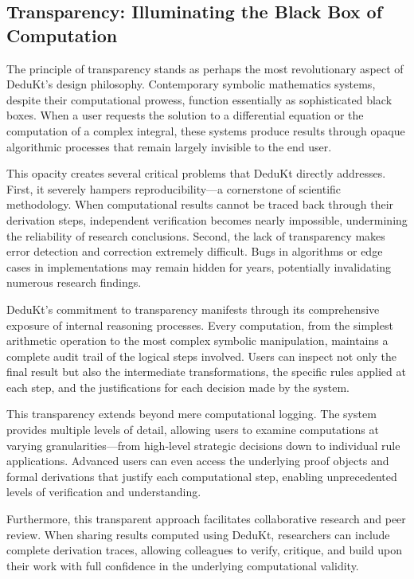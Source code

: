 \subsection{Transparency: Illuminating the Black Box of Computation}\label{subsec:transparency:-illuminating-the-black-box-of-computation}

The principle of transparency stands as perhaps the most revolutionary aspect of DeduKt's design philosophy.
Contemporary symbolic mathematics systems, despite their computational prowess, function essentially as sophisticated black boxes.
When a user requests the solution to a differential equation or the computation of a complex integral, these systems produce results through opaque algorithmic processes that remain largely invisible to the end user.

This opacity creates several critical problems that DeduKt directly addresses.
First, it severely hampers reproducibility—a cornerstone of scientific methodology.
When computational results cannot be traced back through their derivation steps, independent verification becomes nearly impossible, undermining the reliability of research conclusions.
Second, the lack of transparency makes error detection and correction extremely difficult.
Bugs in algorithms or edge cases in implementations may remain hidden for years, potentially invalidating numerous research findings.

DeduKt's commitment to transparency manifests through its comprehensive exposure of internal reasoning processes.
Every computation, from the simplest arithmetic operation to the most complex symbolic manipulation, maintains a complete audit trail of the logical steps involved.
Users can inspect not only the final result but also the intermediate transformations, the specific rules applied at each step, and the justifications for each decision made by the system.

This transparency extends beyond mere computational logging.
The system provides multiple levels of detail, allowing users to examine computations at varying granularities—from high-level strategic decisions down to individual rule applications.
Advanced users can even access the underlying proof objects and formal derivations that justify each computational step, enabling unprecedented levels of verification and understanding.

Furthermore, this transparent approach facilitates collaborative research and peer review.
When sharing results computed using DeduKt, researchers can include complete derivation traces, allowing colleagues to verify, critique, and build upon their work with full confidence in the underlying computational validity.

